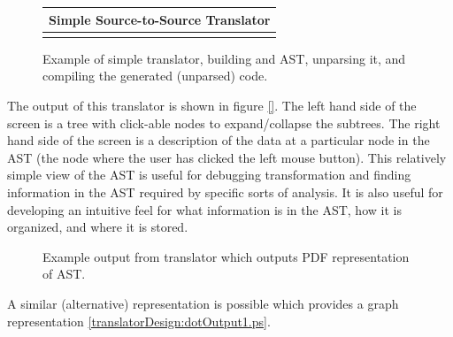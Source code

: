 {\indent
{\mySmallFontSize

\begin{latexonly}
\begin{figure}[tb]
\begin{center}
\begin{tabular}{|c|} \hline
     Simple Source-to-Source Translator
\\\hline\hline

\\\hline
\end{tabular}
\end{center}
\caption{ Example of simple translator, building and AST, unparsing it, and compiling
    the generated (unparsed) code. }
\end{figure}
\end{latexonly}

\begin{htmlonly}
   
\end{htmlonly}

\label{translatorDesign:AstPDFOutputTranslator}

}
}


The output of this translator is shown in figure \ref{}.  The left hand side
of the screen is a tree with click-able nodes to expand/collapse the subtrees.
The right hand side of the screen is a description of the data at a particular 
node in the AST (the node where the user has clicked the left mouse button).
This relatively simple view of the AST is useful for debugging transformation and finding
information in the AST required by specific sorts of analysis.  It is also useful
for developing an intuitive feel for what information is in the AST, how it is organized, 
and where it is stored.

\begin{figure}
\centerline{}
\caption{Example output from translator which outputs PDF representation of AST.}
\label{translatorDesign:pdfOutput1.ps}
\end{figure}

    A similar (alternative) representation is possible which provides a graph 
representation \ref{translatorDesign:dotOutput1.ps}.

